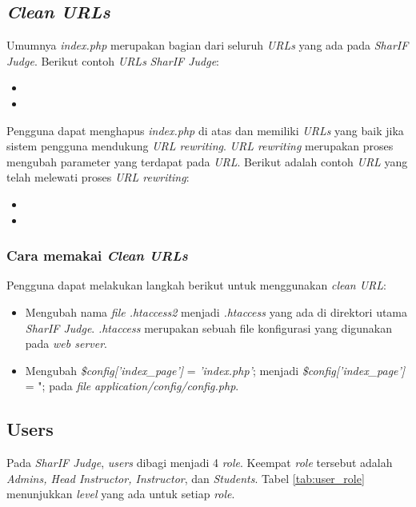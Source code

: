 \subsection{\textit{Clean URLs}}
\label{subsec:clean_urls}
Umumnya \textit{index.php} merupakan bagian dari seluruh \textit{URLs} yang ada pada \textit{SharIF Judge}. Berikut contoh \textit{URLs} \textit{SharIF Judge}:

\begin{itemize}
	\item {}
	\item {}
\end{itemize}

Pengguna dapat menghapus \textit{index.php} di atas dan memiliki \textit{URLs} yang baik jika sistem pengguna mendukung \textit{URL rewriting}. \textit{URL rewriting} merupakan proses mengubah parameter yang terdapat pada \textit{URL}. Berikut adalah contoh \textit{URL} yang telah melewati proses \textit{URL rewriting}:

\begin{itemize}
	\item {}
	\item {}
\end{itemize}

\subsubsection{Cara memakai \textit{Clean URLs}}
\label{subsubsec:clean_urls}
Pengguna dapat melakukan langkah berikut untuk menggunakan \textit{clean URL}:
\begin{itemize}
	\item Mengubah nama \textit{file .htaccess2} menjadi \textit{.htaccess} yang ada di direktori utama \textit{SharIF Judge}. \textit{.htaccess} merupakan sebuah file konfigurasi yang digunakan pada \textit{web server}.
	\item Mengubah \textit{\$config['index\_page']} = \textit{'index.php'}; menjadi\textit{ \$config['index\_page']} = "; pada \textit{file} \textit{application/config/config.php}.
\end{itemize} 

\subsection{Users}
\label{subsec:users}
Pada \textit{SharIF Judge}, \textit{users} dibagi menjadi 4 \textit{role}. Keempat \textit{role} tersebut adalah \textit{Admins, Head Instructor, Instructor}, dan \textit{Students}. Tabel \ref{tab:user_role} menunjukkan \textit{level} yang ada untuk setiap \textit{role}.

